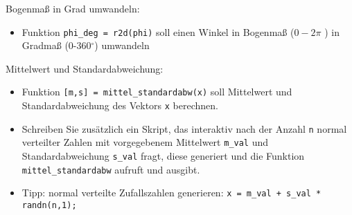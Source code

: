   \secMexercise
  \begin{frame}
      \frameMexercise
      \begin{exercise}
          \sloppy
          Bogenmaß in Grad umwandeln:
          \begin{itemize}
            \item Funktion \texttt{phi\_deg = r2d(phi)} soll einen Winkel in Bogenmaß ($0-2\pi$ ) in Gradmaß (0-360$^{\circ}$) umwandeln
          \end{itemize}
      \end{exercise}
  \end{frame}

  \secMexercise
  \begin{frame}
      \frameMexercise
      \begin{exercise}
          \sloppy
          Mittelwert und Standardabweichung:
          \begin{itemize}
            \item Funktion \texttt{[m,s] = mittel\_standardabw(x)} soll Mittelwert und Standardabweichung des Vektors \texttt{x} berechnen.
            \item Schreiben Sie zusätzlich ein Skript, das interaktiv nach der Anzahl \texttt{n} normal verteilter Zahlen mit vorgegebenem
            Mittelwert \texttt{m\_val} und Standardabweichung \texttt{s\_val} fragt, diese generiert und die Funktion
            \texttt{mittel\_standardabw} aufruft und ausgibt.
            \item Tipp: normal verteilte Zufallszahlen generieren: \texttt{x = m\_val + s\_val * randn(n,1);}
          \end{itemize}
      \end{exercise}
  \end{frame}

